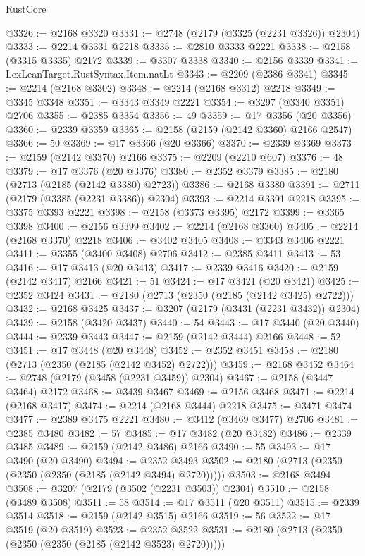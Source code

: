 \begin{lexlean}{RustCore}
\begin{coremodule}
@3326 := @2168 @3320
@3331 := @2748 (@2179 (@3325 (@2231 @3326)) @2304)
@3333 := @2214 @3331 @2218
@3335 := @2810 @3333 @2221
@3338 := @2158 (@3315 @3335) @2172
@3339 := @3307 @3338
@3340 := @2156 @3339
@3341 := LexLeanTarget.RustSyntax.Item.natLt
@3343 := @2209 (@2386 @3341)
@3345 := @2214 (@2168 @3302)
@3348 := @2214 (@2168 @3312) @2218
@3349 := @3345 @3348
@3351 := @3343 @3349 @2221
@3354 := @3297 (@3340 @3351) @2706
@3355 := @2385 @3354
@3356 := 49
@3359 := @17 @3356 (@20 @3356)
@3360 := @2339 @3359
@3365 := @2158 (@2159 (@2142 @3360) @2166 @2547)
@3366 := 50
@3369 := @17 @3366 (@20 @3366)
@3370 := @2339 @3369
@3373 := @2159 (@2142 @3370) @2166
@3375 := @2209 (@2210 @607)
@3376 := 48
@3379 := @17 @3376 (@20 @3376)
@3380 := @2352 @3379
@3385 := @2180 (@2713 (@2185 (@2142 @3380) @2723))
@3386 := @2168 @3380
@3391 := @2711 (@2179 (@3385 (@2231 @3386)) @2304)
@3393 := @2214 @3391 @2218
@3395 := @3375 @3393 @2221
@3398 := @2158 (@3373 @3395) @2172
@3399 := @3365 @3398
@3400 := @2156 @3399
@3402 := @2214 (@2168 @3360)
@3405 := @2214 (@2168 @3370) @2218
@3406 := @3402 @3405
@3408 := @3343 @3406 @2221
@3411 := @3355 (@3400 @3408) @2706
@3412 := @2385 @3411
@3413 := 53
@3416 := @17 @3413 (@20 @3413)
@3417 := @2339 @3416
@3420 := @2159 (@2142 @3417) @2166
@3421 := 51
@3424 := @17 @3421 (@20 @3421)
@3425 := @2352 @3424
@3431 := @2180 (@2713 (@2350 (@2185 (@2142 @3425) @2722)))
@3432 := @2168 @3425
@3437 := @3207 (@2179 (@3431 (@2231 @3432)) @2304)
@3439 := @2158 (@3420 @3437)
@3440 := 54
@3443 := @17 @3440 (@20 @3440)
@3444 := @2339 @3443
@3447 := @2159 (@2142 @3444) @2166
@3448 := 52
@3451 := @17 @3448 (@20 @3448)
@3452 := @2352 @3451
@3458 := @2180 (@2713 (@2350 (@2185 (@2142 @3452) @2722)))
@3459 := @2168 @3452
@3464 := @2748 (@2179 (@3458 (@2231 @3459)) @2304)
@3467 := @2158 (@3447 @3464) @2172
@3468 := @3439 @3467
@3469 := @2156 @3468
@3471 := @2214 (@2168 @3417)
@3474 := @2214 (@2168 @3444) @2218
@3475 := @3471 @3474
@3477 := @2389 @3475 @2221
@3480 := @3412 (@3469 @3477) @2706
@3481 := @2385 @3480
@3482 := 57
@3485 := @17 @3482 (@20 @3482)
@3486 := @2339 @3485
@3489 := @2159 (@2142 @3486) @2166
@3490 := 55
@3493 := @17 @3490 (@20 @3490)
@3494 := @2352 @3493
@3502 := @2180 (@2713 (@2350 (@2350 (@2350 (@2185 (@2142 @3494) @2720)))))
@3503 := @2168 @3494
@3508 := @3207 (@2179 (@3502 (@2231 @3503)) @2304)
@3510 := @2158 (@3489 @3508)
@3511 := 58
@3514 := @17 @3511 (@20 @3511)
@3515 := @2339 @3514
@3518 := @2159 (@2142 @3515) @2166
@3519 := 56
@3522 := @17 @3519 (@20 @3519)
@3523 := @2352 @3522
@3531 := @2180 (@2713 (@2350 (@2350 (@2350 (@2185 (@2142 @3523) @2720)))))

\end{coremodule}
\end{lexlean}
